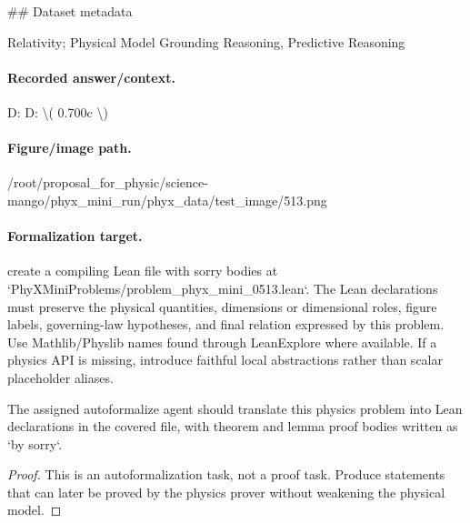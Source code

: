 \#\# Dataset metadata

Relativity; Physical Model Grounding Reasoning, Predictive Reasoning

\paragraph{Recorded answer/context.}
D: D: \textbackslash{}( 0.700c \textbackslash{})

\paragraph{Figure/image path.}
/root/proposal\_for\_physic/science-mango/phyx\_mini\_run/phyx\_data/test\_image/513.png

\paragraph{Formalization target.}
create a compiling Lean file with sorry bodies at `PhyXMiniProblems/problem\_phyx\_mini\_0513.lean`. The Lean declarations must preserve the physical quantities, dimensions or dimensional roles, figure labels, governing-law hypotheses, and final relation expressed by this problem.
Use Mathlib/Physlib names found through LeanExplore where available. If a physics API is missing, introduce faithful local abstractions rather than scalar placeholder aliases.

\begin{theorem}
\label{thm:physics:phyx_mini_0513:target}
The assigned autoformalize agent should translate this physics problem into Lean declarations in the covered file, with theorem and lemma proof bodies written as `by sorry`.
\end{theorem}
\begin{proof}
This is an autoformalization task, not a proof task. Produce statements that can later be proved by the physics prover without weakening the physical model.
\end{proof}

